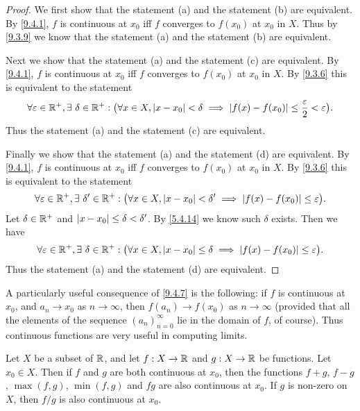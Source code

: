 \begin{proof}
  We first show that the statement (a) and the statement (b) are equivalent.
  By \cref{9.4.1}, \(f\) is continuous at \(x_0\) iff \(f\) converges to \(f(x_0)\) at \(x_0\) in \(X\).
  Thus by \cref{9.3.9} we know that the statement (a) and the statement (b) are equivalent.

  Next we show that the statement (a) and the statement (c) are equivalent.
  By \cref{9.4.1}, \(f\) is continuous at \(x_0\) iff \(f\) converges to \(f(x_0)\) at \(x_0\) in \(X\).
  By \cref{9.3.6} this is equivalent to the statement
  \[
    \forall \varepsilon \in \R^+, \exists\ \delta \in \R^+ : \big(\forall x \in X, \abs{x - x_0} < \delta \implies \abs{f(x) - f(x_0)} \leq \dfrac{\varepsilon}{2} < \varepsilon\big).
  \]
  Thus the statement (a) and the statement (c) are equivalent.

  Finally we show that the statement (a) and the statement (d) are equivalent.
  By \cref{9.4.1}, \(f\) is continuous at \(x_0\) iff \(f\) converges to \(f(x_0)\) at \(x_0\) in \(X\).
  By \cref{9.3.6} this is equivalent to the statement
  \[
    \forall \varepsilon \in \R^+, \exists\ \delta' \in \R^+ : \big(\forall x \in X, \abs{x - x_0} < \delta' \implies \abs{f(x) - f(x_0)} \leq \varepsilon\big).
  \]
  Let \(\delta \in \mathbb{R}^+\) and \(\left\lvert x - x_0\right\rvert \leq \delta < \delta'\).
  By \cref{5.4.14} we know such \(\delta\) exists.
  Then we have
  \[
    \forall \varepsilon \in \mathbb{R}^+, \exists\ \delta \in \mathbb{R}^+ : \big(\forall x \in X, \left\lvert x - x_0\right\rvert \leq \delta \implies \left\lvert f(x) - f(x_0)\right\rvert \leq \varepsilon\big).
  \]
  Thus the statement (a) and the statement (d) are equivalent.
\end{proof}

\begin{rmk}\label{9.4.8}
  A particularly useful consequence of \cref{9.4.7} is the following:
  if \(f\) is continuous at \(x_0\), and \(a_n \to x_0\) as \(n \to \infty\), then \(f(a_n) \to f(x_0)\) as \(n \to \infty\)
  (provided that all the elements of the sequence \((a_n)_{n = 0}^\infty\) lie in the domain of \(f\), of course).
  Thus continuous functions are very useful in computing limits.
\end{rmk}

\begin{prop}\label{9.4.9}
  Let \(X\) be a subset of \(\mathbb{R}\), and let \(f : X \to \mathbb{R}\) and \(g : X \to \mathbb{R}\) be functions.
  Let \(x_0 \in X\).
  Then if \(f\) and \(g\) are both continuous at \(x_0\), then the functions \(f + g\), \(f - g\), \(\max(f, g)\), \(\min(f, g)\) and \(fg\) are also continuous at \(x_0\).
  If \(g\) is non-zero on \(X\), then \(f / g\) is also continuous at \(x_0\).
\end{prop}

